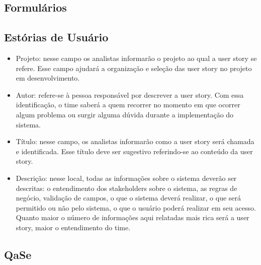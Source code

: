 \begin{anexosenv}

\partanexos

\chapter{Formulários}
	\section{Estórias de Usuário}
	\label{sec:form_us}

		\begin{citacao}

			\begin{itemize}
				\item Projeto: nesse campo os analistas informarão o projeto ao qual a user story se refere. Esse campo ajudará a organização e seleção das user story no projeto em desenvolvimento.
				\item Autor: refere-se à pessoa responsável por descrever a user story. Com essa identificação, o time saberá a quem recorrer no momento em que ocorrer algum problema ou surgir alguma dúvida durante a implementação do sistema.
				\item Título: nesse campo, os analistas informarão como a user story será chamada e identificada. Esse título deve ser sugestivo referindo-se ao conteúdo da user story.
				\item Descrição: nesse local, todas as informações sobre o sistema deverão ser descritas: o entendimento dos stakeholders sobre o sistema, as regras de negócio, validação de campos, o que o sistema deverá realizar, o que será permitido ou não pelo sistema, o que o usuário poderá realizar em seu acesso. Quanto maior o número de informações aqui relatadas mais rica será a user story, maior o entendimento do time.
			\end{itemize}

		\end{citacao}

	\section{QaSe}
	\label{sec:form_qase}

		\begin{citacao}
			\begin{itemize}


\end{itemize}
\end{citacao}
\end{anexosenv}

